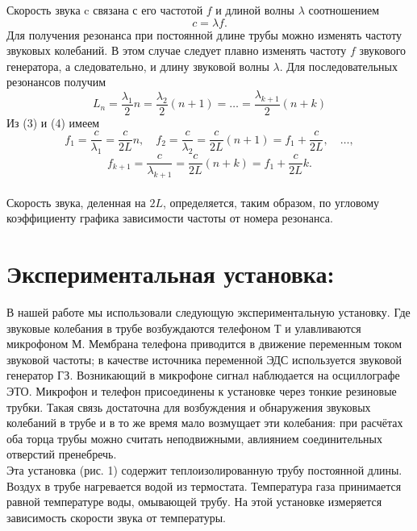 \documentclass[a4paper, 12pt]{article}%
\begin{document}
Скорость звука c связана с его частотой $f$ и длиной волны $\lambda$ соотношением
\begin{equation}
	c = \lambda f.
\end{equation}
Для получения резонанса при постоянной длине трубы можно изменять частоту звуковых колебаний. В этом случае следует плавно изменять частоту $f$
звукового генератора, а следовательно, и длину звуковой волны $\lambda$.
Для последовательных резонансов получим
\begin{equation}
L_n = \frac{\lambda_1}{2}n=\frac{\lambda_2}{2}(n+1) = \ldots = \frac{\lambda_{k+1}}{2}(n+k)
\end{equation}
Из (3) и (4) имеем
\[
	f_1 = \frac{c}{\lambda_1} = \frac{c}{2L}n, \quad f_2 = \frac{c}{\lambda_2} = \frac{c}{2L}(n+1) = f_1 + \frac{c}{2L},\quad \ldots,
\]
\begin{equation}
f_{k+1} = \frac{c}{\lambda_{k+1}} = \frac{c}{2L}(n+k)= f_1 + \frac{c}{2L}k.
\end{equation}\\
Скорость звука, деленная на $2L$, определяется, таким образом,
по угловому коэффициенту графика зависимости частоты от номера
резонанса.

\section{Экспериментальная установка:}
В нашей работе мы использовали следующую экспериментальную установку. Где звуковые колебания в трубе возбуждаются телефоном Т и улавливаются микрофоном М. Мембрана телефона приводится в движение переменным током звуковой частоты; в качестве источника переменной ЭДС используется звуковой генератор ГЗ. Возникающий в микрофоне сигнал наблюдается на осциллографе ЭТО. Микрофон и телефон присоединены к установке через тонкие резиновые трубки. Такая связь достаточна для возбуждения и обнаружения звуковых колебаний в трубе и в то же время мало возмущает эти колебания: при расчётах оба торца трубы можно считать неподвижными, авлиянием соединительных отверстий пренебречь.\\
\linebreak Эта установка (рис. 1) содержит теплоизолированную трубу постоянной длины. Воздух в трубе нагревается водой из термостата. Температура газа принимается равной температуре воды, омывающей трубу. На этой установке измеряется зависимость скорости звука от температуры.
\end{document}
